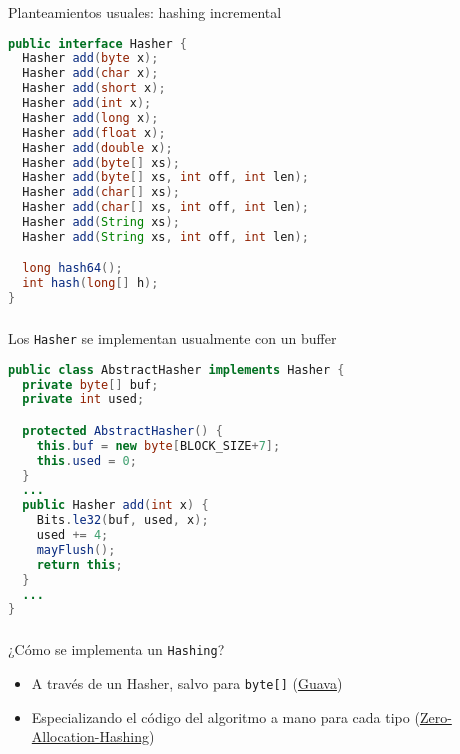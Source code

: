\begin{frame}[fragile]
  \frametitle{\ft}
  \begin{block}{Planteamientos usuales: hashing incremental}
    \begin{lstlisting}[language=java]
public interface Hasher {
  Hasher add(byte x);
  Hasher add(char x);
  Hasher add(short x);
  Hasher add(int x);
  Hasher add(long x);
  Hasher add(float x);
  Hasher add(double x);
  Hasher add(byte[] xs);
  Hasher add(byte[] xs, int off, int len);
  Hasher add(char[] xs);
  Hasher add(char[] xs, int off, int len);
  Hasher add(String xs);
  Hasher add(String xs, int off, int len);

  long hash64();
  int hash(long[] h);
}
    \end{lstlisting}
  \end{block}
\end{frame}

\begin{frame}[fragile]
  \frametitle{\ft}
  \begin{block}{Los {\tt Hasher} se implementan usualmente con un buffer}
    \begin{lstlisting}[language=java]
public class AbstractHasher implements Hasher {
  private byte[] buf;
  private int used;

  protected AbstractHasher() {
    this.buf = new byte[BLOCK_SIZE+7];
    this.used = 0;
  }
  ...
  public Hasher add(int x) {
    Bits.le32(buf, used, x);
    used += 4;
    mayFlush();
    return this;
  }
  ...
}
    \end{lstlisting}
  \end{block}
\end{frame}


\begin{frame}[fragile]
  \frametitle{\ft}
  \begin{block}{¿Cómo se implementa un {\tt Hashing}?}
    \begin{itemize}
    \item A través de un Hasher, salvo para {\tt byte[]}
      (\href{https://github.com/google/guava/blob/master/guava/src/com/google/common/hash/AbstractHashFunction.java}{Guava})
    \item Especializando el código del algoritmo a mano para cada tipo
      (\href{https://github.com/OpenHFT/Zero-Allocation-Hashing/blob/ea/src/main/java/net/openhft/hashing/XxHash.java}{Zero-Allocation-Hashing})
    \end{itemize}
  \end{block}
\end{frame}


